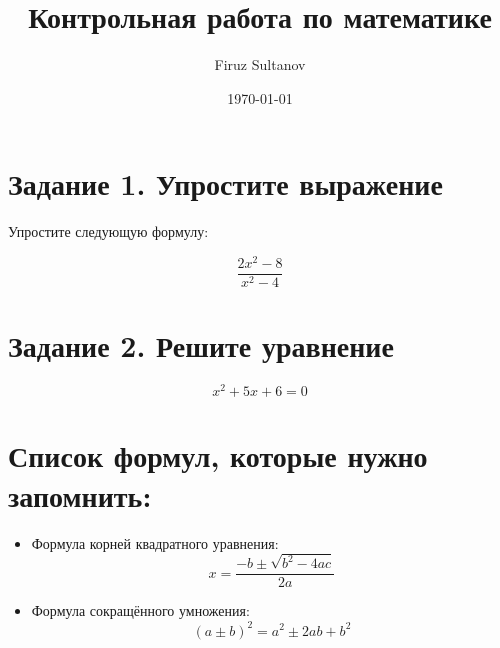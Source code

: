 \documentclass[12pt]{article}
\title{Контрольная работа по математике}
\author{Firuz Sultanov}
\date{\today}
\begin{document}
\maketitle

\section*{Задание 1. Упростите выражение}

Упростите следующую формулу:

\[
\frac{2x^2 - 8}{x^2 - 4}
\]

\section*{Задание 2. Решите уравнение}

\[
x^2 + 5x + 6 = 0
\]

\section*{Список формул, которые нужно запомнить:}

\begin{itemize}
  \item Формула корней квадратного уравнения:
  \[
  x = \frac{-b \pm \sqrt{b^2 - 4ac}}{2a}
  \]
  \item Формула сокращённого умножения:
  \[
  (a \pm b)^2 = a^2 \pm 2ab + b^2
  \]
\end{itemize}
\end{document}
